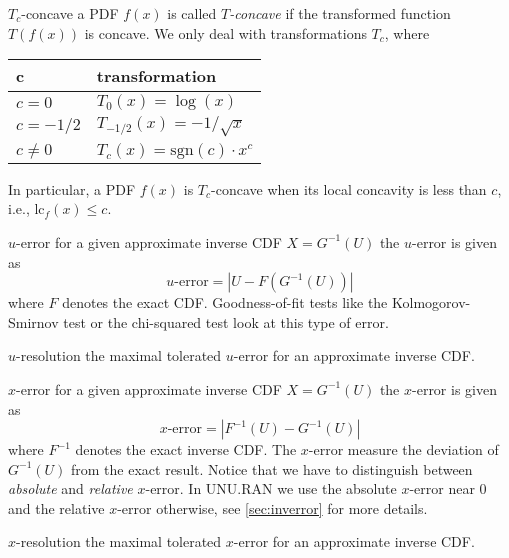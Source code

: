 \begin{labeling}[~--~]{\hspace{5em}}
\item[$T_c$-concave]
  a PDF $f(x)$ is called \emph{$T$-concave} if the transformed function
  $T(f(x))$ is concave. 
  We only deal with transformations $T_c$, where
  \begin{center}
    \begin{tabular}{l|l}
      c         & transformation \\
      \hline
      $c=0$     & $T_0(x) = \log(x)$ \\
      $c=-1/2$  & $T_{-1/2}(x) = -1/\sqrt{x}$ \\
      $c\not=0$ & $T_c(x) = \mathrm{sgn}(c) \cdot x^c$ \\
    \end{tabular}
  \end{center}
  In particular, a PDF $f(x)$ is $T_c$-concave when its local
  concavity is less than $c$, i.e.,
  $\mathrm{lc}_f(x) \leq c$.

\item[$u$-error]
  for a given approximate inverse CDF $X=G^{-1}(U)$ the $u$-error is
  given as
  \[ \mbox{$u$-error} = |U-F(G^{-1}(U))| \]
  where $F$ denotes the exact CDF.
  Goodness-of-fit tests like the Kolmogorov-Smirnov test or the
  chi-squared test look at this type of error.

\item[$u$-resolution]
  the maximal tolerated $u$-error for an approximate inverse CDF.

\item[$x$-error]
  for a given approximate inverse CDF $X=G^{-1}(U)$ the $x$-error is
  given as 
  \[ \mbox{$x$-error} = |F^{-1}(U)-G^{-1}(U)| \]
  where $F^{-1}$ denotes the exact inverse CDF.
  The $x$-error measure the deviation of $G^{-1}(U)$
  from the exact result.
  Notice that we have to distinguish between \emph{absolute} and
  \emph{relative} $x$-error. In UNU.RAN we use the absolute $x$-error
  near $0$ and the relative $x$-error otherwise,
  see \autoref{sec:inverror} for more details.

\item[$x$-resolution]
  the maximal tolerated $x$-error for an approximate inverse CDF.

\end{labeling}

